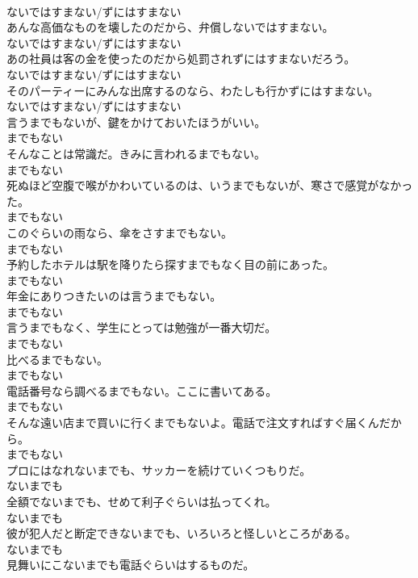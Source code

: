 \documentclass[8pt]{extreport}
\begin{document}
\begin{CJK}{UTF8}{min}
\\	ないではすまない/ずにはすまない
\\	あんな高価なものを壊したのだから、弁償しないではすまない。	
\\	ないではすまない/ずにはすまない
\\	あの社員は客の金を使ったのだから処罰されずにはすまないだろう。	
\\	ないではすまない/ずにはすまない
\\	そのパーティーにみんな出席するのなら、わたしも行かずにはすまない。	
\\	ないではすまない/ずにはすまない
\\	言うまでもないが、鍵をかけておいたほうがいい。	
\\	までもない
\\	そんなことは常識だ。きみに言われるまでもない。	
\\	までもない
\\	死ぬほど空腹で喉がかわいているのは、いうまでもないが、寒さで感覚がなかった。	
\\	までもない
\\	このぐらいの雨なら、傘をさすまでもない。	
\\	までもない
\\	予約したホテルは駅を降りたら探すまでもなく目の前にあった。	
\\	までもない
\\	年金にありつきたいのは言うまでもない。	
\\	までもない
\\	言うまでもなく、学生にとっては勉強が一番大切だ。	
\\	までもない
\\	比べるまでもない。	
\\	までもない
\\	電話番号なら調べるまでもない。ここに書いてある。	
\\	までもない
\\	そんな遠い店まで買いに行くまでもないよ。電話で注文すればすぐ届くんだから。	
\\	までもない
\\	プロにはなれないまでも、サッカーを続けていくつもりだ。	
\\	ないまでも
\\	全額でないまでも、せめて利子ぐらいは払ってくれ。	
\\	ないまでも
\\	彼が犯人だと断定できないまでも、いろいろと怪しいところがある。	
\\	ないまでも
\\	見舞いにこないまでも電話ぐらいはするものだ。	

\end{CJK}
\end{document}

